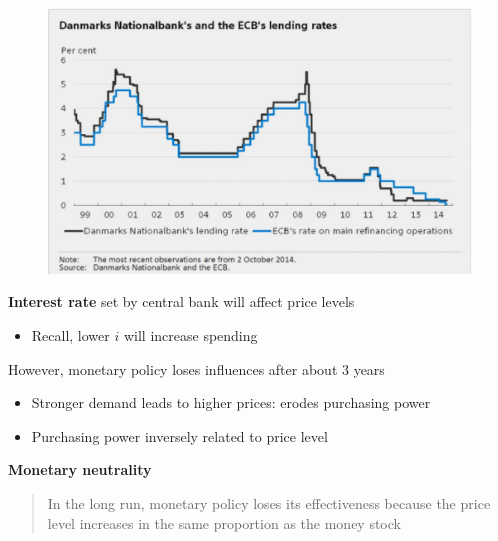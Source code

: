 \documentclass{beamer}
\begin{document}
\begin{frame}
  \begin{figure}
    \includegraphics[scale=.5]{denmark.eps}
  \end{figure}
\end{frame}

\begin{frame}
  \textbf{Interest rate} set by central bank will affect price levels
  \begin{itemize}
    \item Recall, lower $i$ will increase spending
  \end{itemize}
  \medskip
  However, monetary policy loses influences after about 3 years
  \begin{itemize}
    \item Stronger demand leads to higher prices: erodes purchasing power
    \item Purchasing power inversely related to price level
  \end{itemize}
  \medskip
  \textbf{Monetary neutrality}
  \begin{quote}
      In the long run, monetary policy loses its effectiveness because the price level increases in the same proportion as the money stock
  \end{quote}  
\end{frame}
\end{document}
